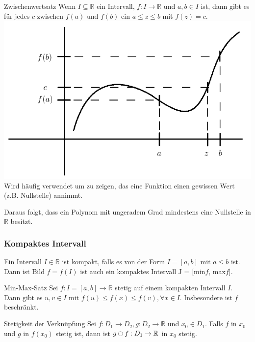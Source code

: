 \documentclass[a4paper,fontsize = 7pt]{scrartcl}
\def\R{\mathbb{R}}
\begin{document}
\begin{mainbox}{Zwischenwertsatz}
  \vspace{-4pt}
 Wenn $I \subseteq \R$ ein Intervall, $f: I \to \R$ und $a, b \in I$ ist, dann gibt es für jedes $c$ zwischen $f(a)$ und $f(b)$ ein $a \le z \le b$ mit $f(z) = c$.
 \includegraphics[width=\linewidth]{zwischenwertsatz.png}
 Wird häufig verwendet um zu zeigen, das eine Funktion einen gewissen Wert (z.B. Nullstelle) annimmt.
 \vspace{-4pt}
\end{mainbox}
Daraus folgt, dass ein Polynom mit ungeradem Grad mindestens eine Nullstelle in $\R$ besitzt.

\subsubsection{Kompaktes Intervall}
Ein Intervall $I \in \R$ ist kompakt, falls es von der Form $I = [a,b]$ mit $a \le b$ ist.
Dann ist Bild $f = f(I)$ ist auch ein kompaktes Intervall J = [min$f$, max$f$].

\begin{mainbox}{Min-Max-Satz}
  \vspace{-4pt}
 Sei $f: I = [a,b] \to \R$ stetig auf einem kompakten Intervall $I$. Dann gibt es $u, v \in I$ mit $f(u) \le f(x) \le f(v), \forall x \in I$. Insbesondere ist $f$ beschränkt.
 \vspace{-4pt}
\end{mainbox}

\begin{subbox}{Stetigkeit der Verknüpfung}
 Sei $f: D_1 \to D_2, g: D_2 \to \R$ und $x_0 \in D_1$. Falls $f$ in $x_0$ und $g$ in $f(x_0)$ stetig ist, dann ist $g \ocircle f: D_1 \to \R$ in $x_0$ stetig.
\end{subbox}
\end{document}
